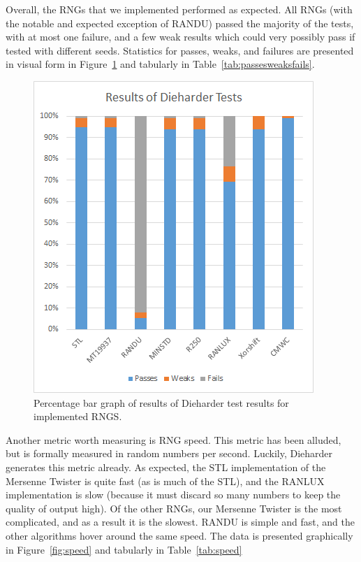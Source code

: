 Overall, the RNGs that we implemented performed as expected. All RNGs (with the notable and expected exception of RANDU) passed the majority of the tests, with at most one failure, and a few weak results which could very possibly pass if tested with different seeds. Statistics for passes, weaks, and failures are presented in visual form in Figure~\ref{fig:passesweaksfails} and tabularly in Table~\ref{tab:passesweaksfails}.

\begin{figure}[tb]
    \begin{center}
        \includegraphics[width=\linewidth]{figures/passesweaksfails.png}
    \end{center}
    \caption{Percentage bar graph of results of Dieharder test results for implemented RNGS.}
    \label{fig:passesweaksfails}
\end{figure}



Another metric worth measuring is RNG speed. This metric has been alluded, but is formally measured in random numbers per second. Luckily, Dieharder generates this metric already. As expected, the STL implementation of the Mersenne Twister is quite fast (as is much of the STL), and the RANLUX implementation is slow (because it must discard so many numbers to keep the quality of output high). Of the other RNGs, our Mersenne Twister is the most complicated, and as a result it is the slowest. RANDU is simple and fast, and the other algorithms hover around the same speed. The data is presented graphically in Figure~\ref{fig:speed} and tabularly in Table~\ref{tab:speed}

